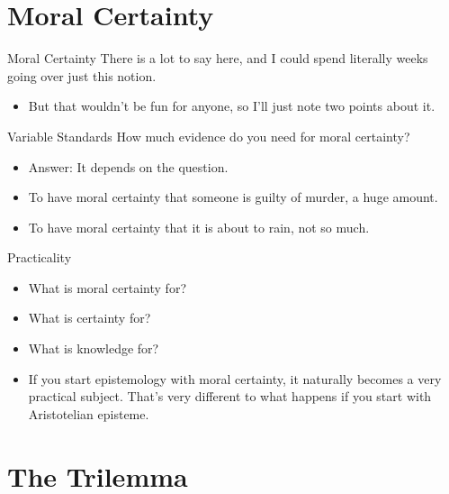 \documentclass[
  17pt,
  letterpaper,
  ignorenonframetext,
  aspectratio=169,
  handout]{beamer}
\providecommand{\tightlist}{%
  \setlength{\itemsep}{0pt}\setlength{\parskip}{0pt}}\usepackage{longtable,booktabs,array}
\begin{document}
\hypertarget{moral-certainty}{%
\section{Moral Certainty}\label{moral-certainty}}

\begin{frame}{Moral Certainty}
\protect\hypertarget{moral-certainty-1}{}
There is a lot to say here, and I could spend literally weeks going over
just this notion.

\begin{itemize}[<+->]
\tightlist
\item
  But that wouldn't be fun for anyone, so I'll just note two points
  about it.
\end{itemize}
\end{frame}

\begin{frame}{Variable Standards}
\protect\hypertarget{variable-standards}{}
How much evidence do you need for moral certainty?

\begin{itemize}[<+->]
\tightlist
\item
  Answer: It depends on the question.
\item
  To have moral certainty that someone is guilty of murder, a huge
  amount.
\item
  To have moral certainty that it is about to rain, not so much.
\end{itemize}
\end{frame}

\begin{frame}{Practicality}
\protect\hypertarget{practicality}{}
\begin{itemize}[<+->]
\item
  What is moral certainty for?
\item
  What is certainty for?
\item
  What is knowledge for?
\item
  If you start epistemology with moral certainty, it naturally becomes a
  very practical subject. That's very different to what happens if you
  start with Aristotelian episteme.
\end{itemize}
\end{frame}

\hypertarget{the-trilemma}{%
\section{The Trilemma}\label{the-trilemma}}
\end{document}
